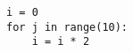 \documentclass[final]{beamer}
\begin{document}
\begin{lstlisting}
i = 0
for j in range(10):
    i = i * 2
\end{lstlisting}
\end{document}
